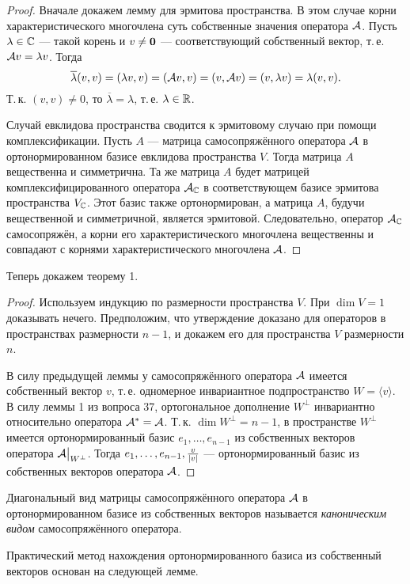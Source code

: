 \begin{proof}
    Вначале докажем лемму для эрмитова пространства. В этом случае корни характеристического многочлена суть собственные значения оператора $\mathcal{A}$. Пусть $\lambda \in \mathbb{C}$ --- такой корень и $v \ne \boldsymbol{0}$ --- соответствующий собственный вектор, т.\,е. $\mathcal{A} v = \lambda v$. Тогда
    \[
        \overline{\lambda}(v, v) = (\lambda v, v) = (\mathcal{A} v, v) = (v, \mathcal{A} v) = (v, \lambda v) = \lambda(v, v).
    \]
    Т.\,к. $(v, v) \ne 0$, то $\overline{\lambda} = \lambda$, т.\,е. $\lambda \in \mathbb{R}$.

    Случай евклидова пространства сводится к эрмитовому случаю при помощи комплексификации. Пусть $A$ --- матрица самосопряжённого оператора $\mathcal{A}$ в ортонормированном базисе евклидова пространства $V$. Тогда матрица $A$ вещественна и симметрична. Та же матрица $A$ будет матрицей комплексифицированного оператора $\mathcal{A}_{\mathbb{C}}$ в соответствующем базисе эрмитова пространства $V_{\mathbb{C}}$. Этот базис также ортонормирован, а матрица $A$, будучи вещественной и симметричной, является эрмитовой. Следовательно, оператор $\mathcal{A}_{\mathbb{C}}$ самосопряжён, а корни его характеристического многочлена вещественны и совпадают с корнями характеристического многочлена $\mathcal{A}$.
\end{proof}

Теперь докажем теорему 1.

\begin{proof}
    Используем индукцию по размерности пространства $V$. При $\dim V = 1$ доказывать нечего. Предположим, что утверждение доказано для операторов в пространствах размерности $n - 1$, и докажем его для пространства $V$ размерности $n$.

    В силу предыдущей леммы у самосопряжённого оператора $\mathcal{A}$ имеется собственный вектор $v$, т.\,е. одномерное инвариантное подпространство $W = \langle v\rangle$. В силу леммы 1 из вопроса 37, ортогональное дополнение $W^\perp$ инвариантно относительно оператора $\mathcal{A}^\ast = \mathcal{A}$. Т.\,к. $\dim W^\perp = n - 1$, в пространстве $W^\perp$ имеется ортонормированный базис $e_1, \ldots, e_{n - 1}$ из собственных векторов оператора $\mathcal{A}\big|_{W^\perp}$. Тогда $e_1, \ldots, e_{n - 1}, \frac{v}{\left\lvert v\right\rvert}$ --- ортонормированный базис из собственных векторов оператора $\mathcal{A}$.
\end{proof}

Диагональный вид матрицы самосопряжённого оператора $\mathcal{A}$ в ортонормированном базисе из собственных векторов называется \textit{каноническим видом} самосопряжённого оператора.

Практический метод нахождения ортонормированного базиса из собственный векторов основан на следующей лемме.

